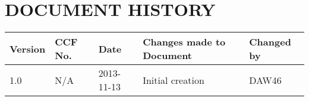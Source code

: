 \documentclass{project}
\begin{document}



\section*{DOCUMENT HISTORY}
\begin{flushleft}
\begin{tabular}{ | p{1.5cm} | p{1cm} | p{2cm} | p{6cm}| p{1.5cm}| }
\hline
Version & CCF No. & Date & Changes made to Document & Changed by \\
\hline

1.0 & N/A & 2013-11-13 & Initial creation & DAW46 \\
\hline

\end{tabular}
\end{flushleft}
\label{thelastpage}
\end{document}
